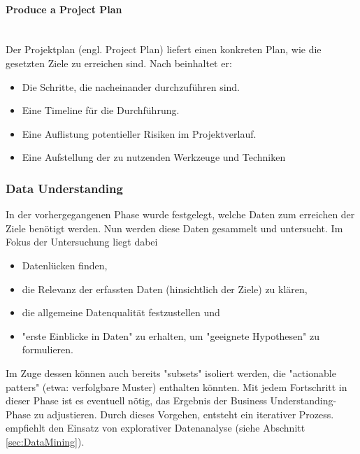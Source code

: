 \paragraph{Produce a Project Plan}\mbox{} \\
Der Projektplan (engl. Project Plan) liefert einen konkreten Plan, wie die gesetzten Ziele zu erreichen sind. Nach \citep[S.~15]{shearer_crisp-dm_2000} beinhaltet er:
\begin{itemize}
\item Die Schritte, die nacheinander durchzuführen sind.
\item Eine Timeline  für die Durchführung.
\item Eine Auflistung potentieller Risiken im Projektverlauf.
\item Eine Aufstellung der zu nutzenden Werkzeuge und Techniken \citep[S.~16]{chapman_crisp-dm_2000}
\end{itemize}


\subsubsection{Data Understanding}
In der vorhergegangenen Phase wurde festgelegt, welche Daten zum erreichen der Ziele benötigt werden. Nun werden diese Daten gesammelt und untersucht. Im Fokus der Untersuchung liegt dabei\citep[S.~73]{swamynathan_mastering_2017}
\begin{itemize}
\item Datenlücken finden,
\item die Relevanz der erfassten Daten (hinsichtlich der Ziele) zu klären,
\item die allgemeine Datenqualität festzustellen und
\item "erste Einblicke in Daten" zu erhalten, um "geeignete Hypothesen"\citep[S.~73; eigene Übersetzung]{swamynathan_mastering_2017} zu formulieren.
\end{itemize}
Im Zuge dessen können auch bereits "subsets" isoliert werden, die "actionable patters"\citep[Punkt 1.4.1.2.d]{larose_discovering_2014} (etwa: verfolgbare Muster) enthalten könnten. Mit jedem Fortschritt in dieser Phase ist es eventuell nötig, das Ergebnis der Business Understanding-Phase zu adjustieren. Durch dieses Vorgehen, entsteht ein iterativer Prozess.\citep[S.~73]{swamynathan_mastering_2017} \citep[Punkt 1.4.1.2.b]{larose_discovering_2014} empfiehlt den Einsatz von explorativer Datenanalyse (siehe Abschnitt \ref{sec:DataMining}). 


